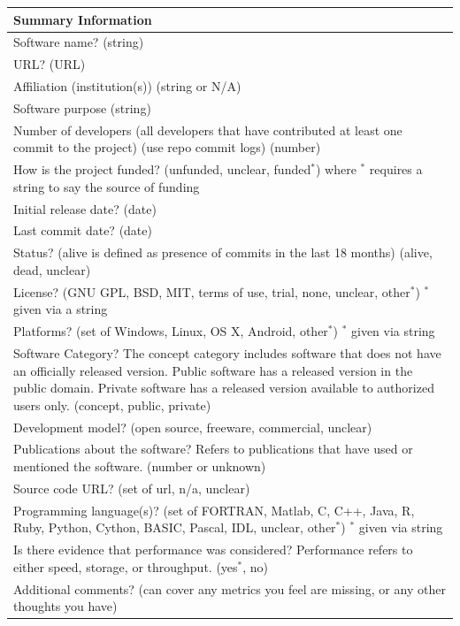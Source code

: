 \documentclass[letterpaper,cleveref]{lipics-v2019}
\begin{document}
\newpage

\label{measurementtemplate}
\def\arraystretch{1.22}
\begin{tabular}{p{14cm}}
	\hline
	\textbf{Summary Information}\\
	\hline
	Software name? (string)\\
	URL? (URL)\\
	Affiliation (institution(s)) (string or {N/A})\\
	Software purpose (string)\\
	Number of developers (all developers that have contributed at least one commit
	to the project) (use repo commit logs) (number)\\
	How is the project funded? (unfunded, unclear, funded$^*$) where $^*$ requires a
	string to say the source of funding\\
	Initial release date? (date)\\
	Last commit date? (date)\\
	Status? (alive is defined as presence of commits in the last 18 months)
	({alive, dead, unclear})\\
	License? ({GNU GPL, BSD, MIT, terms of use, trial, none, unclear, other$^*$}) $^*$
	given via a string \\
	Platforms? (set of {Windows, Linux, OS X, Android, other$^*$}) $^*$ given via
	string\\
	Software Category? The concept category includes software that does not have
	an officially released version. Public software has a released version in the
	public domain. Private software has a released version available to authorized
	users only. ({concept, public, private})\\
	Development model? ({open source, freeware, commercial, unclear})\\
	Publications about the software? Refers to publications that have used or
	mentioned the software. (number or {unknown})\\
	Source code URL? ({set of url, n/a, unclear})\\
	Programming language(s)? (set of {FORTRAN, Matlab, C, C++, Java, R, Ruby,
	Python, Cython, BASIC, Pascal, IDL, unclear, other$^*$}) $^*$ given via string \\
	Is there evidence that performance was considered? Performance refers to
	either speed, storage, or throughput. ({yes$^*$, no})\\
	Additional comments? (can cover any metrics you feel are missing, or any other
	thoughts you have) \\
	\hline
\end{tabular}
\end{document}
